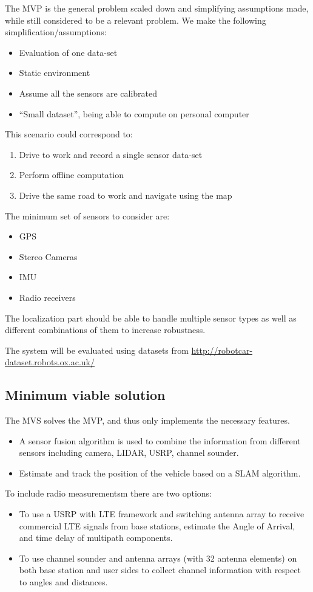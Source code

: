 The \gls{MVP} is the general problem scaled down and simplifying
assumptions made, while still considered to be a relevant problem. We make the following
simplification/assumptions:
\begin{itemize}
\item Evaluation of one data-set
\item Static environment
\item Assume all the sensors are calibrated
\item ``Small dataset'', being able to compute on personal computer
\end{itemize}
This scenario could correspond to:
\begin{enumerate}
\item Drive to work and record a single sensor data-set
\item Perform offline computation
\item Drive the same road to work and navigate using the map
\end{enumerate}
The minimum set of sensors to consider are:
\begin{itemize}
\item GPS
\item Stereo Cameras
\item IMU
\item Radio receivers
\end{itemize}

The localization part should be able to handle multiple sensor types as well as different combinations of them to increase robustness.


The system will be evaluated using datasets from
\url{http://robotcar-dataset.robots.ox.ac.uk/}

\subsection{Minimum viable solution}


The \gls{MVS} solves the \gls{MVP}, and thus only implements the necessary
features.
\begin{itemize}
\item A sensor fusion algorithm is used to combine the information
  from different sensors including camera, LIDAR, USRP, channel
  sounder.
\item Estimate and track the position of the vehicle based on a SLAM
  algorithm.
\end{itemize}

To include radio measurementsm there are two options:
\begin{itemize}
\item To use a USRP with LTE framework and switching antenna array to
  receive commercial LTE signals from base stations, estimate the
  Angle of Arrival, and time delay of multipath components.
\item To use channel sounder and antenna arrays (with 32 antenna
  elements) on both base station and user sides to collect channel
  information with respect to angles and distances.
\end{itemize}

